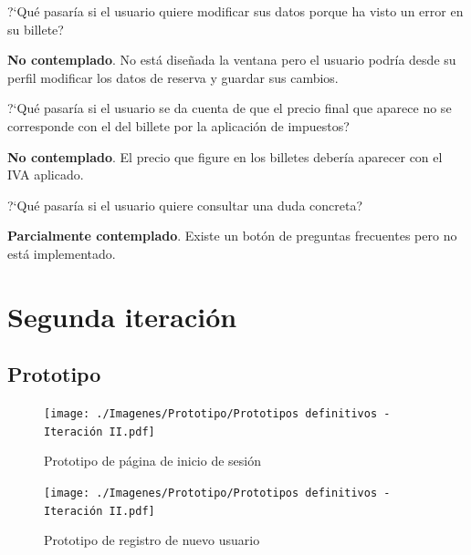 \begin{escenario} %
    \centering
?`Qué pasaría si el usuario quiere modificar sus datos porque ha visto un error en su billete? 

\begin{solucion} \centering
    \textbf{No contemplado}.  No está diseñada la ventana pero el usuario podría desde su perfil modificar los datos de reserva y guardar sus cambios.
\end{solucion}
\end{escenario}

\begin{escenario} %
    \centering
?`Qué pasaría si el usuario se da cuenta de que el precio final que aparece no se corresponde con el del billete por la aplicación de impuestos?

\begin{solucion} \centering
    \textbf{No contemplado}. El precio que figure en los billetes debería aparecer con el IVA aplicado.

\end{solucion}
\end{escenario}

\begin{escenario} %
    \centering
?`Qué pasaría si el usuario quiere consultar una duda concreta?

\begin{solucion}
    \centering
    \textbf{Parcialmente contemplado}. Existe un botón de preguntas frecuentes pero no está implementado.
\end{solucion}
\end{escenario}

\section{Segunda iteración}

\subsection{Prototipo}

\begin{figure}[H]
    \centering
    \texttt{[image: ./Imagenes/Prototipo/Prototipos definitivos - Iteración II.pdf]}
    \caption{Prototipo de página de inicio de sesión}
    \label{fig:prot2_ses}
\end{figure}

\begin{figure}[H]
    \centering
    \texttt{[image: ./Imagenes/Prototipo/Prototipos definitivos - Iteración II.pdf]}
    \caption{Prototipo de registro de nuevo usuario}
    \label{fig:prot2_reg}
\end{figure}

